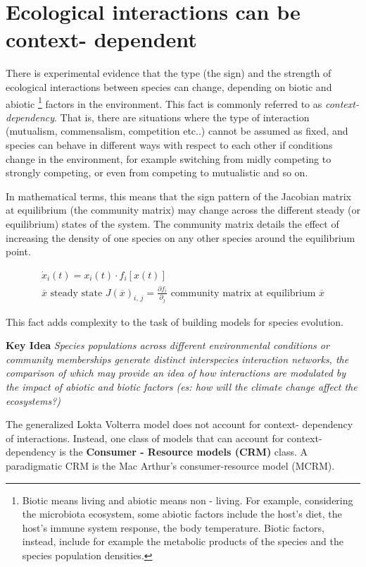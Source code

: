 \section{Ecological interactions can be context- dependent}
There is experimental evidence that the type  (the sign) and the strength of ecological interactions between species can change, depending on biotic and abiotic \footnote{Biotic means living and abiotic means non - living. For example, considering the microbiota ecosystem, some abiotic factors include the host's diet, the host's immune system response, the body temperature. Biotic factors, instead, include for example the metabolic products of the species and the species population densities.} factors in the environment. This fact is commonly referred to as \textit{context-dependency}. That is, there are situations where the type of interaction (mutualism, commensalism, competition etc..) cannot be assumed as fixed, and species can behave in different ways with respect to each other if conditions change in the environment, for example switching from midly competing to strongly competing, or even from competing to mutualistic and so on.

In mathematical terms, this means that the sign pattern of the Jacobian matrix at equilibrium (the community matrix) may change across the different steady (or equilibrium) states of the system. The community matrix details the effect of increasing the density of one species on any other species around the equilibrium point.


\begin{center}
\begin{align}
    \dot{x}_i(t) = x_i(t)\cdot f_i[x(t)] \\
    \overline{x}\,\, \text{steady state}\,\, J(\overline{x})_{i,\,j} = \frac{\partial f_i}{\partial_j} \,\, \text{community matrix at equilibrium}\,\, \overline{x}
\end{align}
\end{center}
This fact adds complexity to the task of building models for species evolution. 

\textbf{Key Idea}
   \textit{Species populations across different environmental conditions or community memberships generate distinct interspecies interaction networks, the comparison of which may provide an idea of how interactions are modulated by the impact of abiotic and biotic factors (es: how will the climate change affect the ecosystems?)} 

The generalized Lokta Volterra model does not account for context- dependency of interactions. Instead, one class of models that can account for context-dependency is the \textbf{Consumer - Resource models (CRM)} class. A paradigmatic CRM is the Mac Arthur's consumer-resource model (MCRM).

